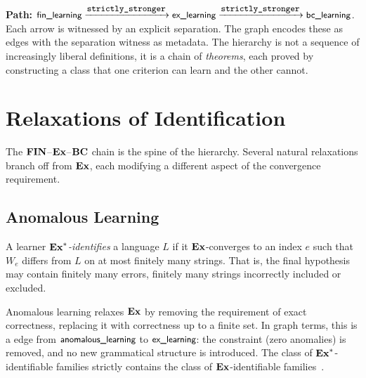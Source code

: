 \begin{traversal}
\textbf{Path:} $\textsf{\small fin\_learning} \xrightarrow{\texttt{\small strictly\_stronger}} \textsf{\small ex\_learning} \xrightarrow{\texttt{\small strictly\_stronger}} \textsf{\small bc\_learning}$.\\[3pt]
Each arrow is witnessed by an explicit separation. The graph encodes these as  edges with the separation witness as metadata. The hierarchy is not a sequence of increasingly liberal definitions, it is a chain of \emph{theorems}, each proved by constructing a class that one criterion can learn and the other cannot.
\end{traversal}


\section{Relaxations of Identification}
\label{sec:relaxations}

The $\mathbf{FIN}$--$\mathbf{Ex}$--$\mathbf{BC}$ chain is the spine of the hierarchy. Several natural relaxations branch off from $\mathbf{Ex}$, each modifying a different aspect of the convergence requirement.

\subsection{Anomalous Learning}
\label{sec:anomalous}

\begin{defn}
\label{def:anomalous}
A learner \emph{$\mathbf{Ex}^*$-identifies} a language $L$ if it $\mathbf{Ex}$-converges to an index $e$ such that $W_e$ differs from $L$ on at most finitely many strings. That is, the final hypothesis may contain finitely many errors, finitely many strings incorrectly included or excluded.
\end{defn}

Anomalous learning relaxes $\mathbf{Ex}$ by removing the requirement of exact correctness, replacing it with correctness up to a finite set. In graph terms, this is a  edge from $\textsf{\small anomalous\_learning}$ to $\textsf{\small ex\_learning}$: the constraint (zero anomalies) is removed, and no new grammatical structure is introduced. The class of $\mathbf{Ex}^*$-identifiable families strictly contains the class of $\mathbf{Ex}$-identifiable families~\cite{CaseSmith1983}.

